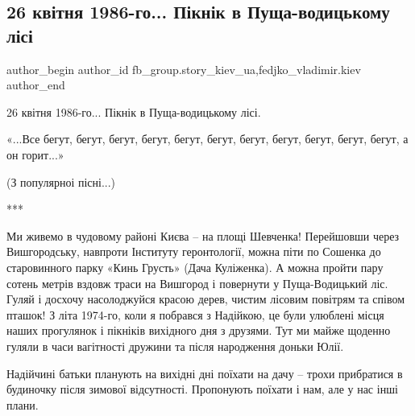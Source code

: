  
 
 
 
 
 
\subsection{26 квітня 1986-го... Пікнік в Пуща-водицькому лісі}
\label{sec:30_11_2021.fb.fb_group.story_kiev_ua.1.chaes_piknik_puscha_vodica}
 
\ifcmt
 author_begin
   author_id fb_group.story_kiev_ua,fedjko_vladimir.kiev
 author_end
\fi

26 квітня 1986-го... Пікнік в Пуща-водицькому лісі.

«...Все бегут, бегут, бегут, бегут, бегут, бегут, бегут, бегут, бегут, бегут, бегут, 
а он горит...»

(З популярноі пісні...)

***

Ми живемо в чудовому районі Києва – на площі Шевченка! Перейшовши через
Вишгородську, навпроти Інституту геронтології, можна піти по Сошенка до
старовинного парку «Кинь Грусть» (Дача Куліженка). А можна пройти пару сотень
метрів вздовж траси на Вишгород і повернути у Пуща-Водицький ліс. Гуляй і
досхочу насолоджуйся красою дерев, чистим лісовим повітрям та співом пташок! З
літа 1974-го, коли я побрався з Надійкою, це були улюблені місця наших
прогулянок і пікніків вихідного дня з друзями. Тут ми майже щоденно гуляли в
часи вагітності дружини та після народження доньки Юлії. 



Надійчині батьки планують на вихідні дні поїхати на дачу – трохи прибратися в
будиночку після зимової відсутності. Пропонують поїхати і нам, але у нас інші
плани.  

